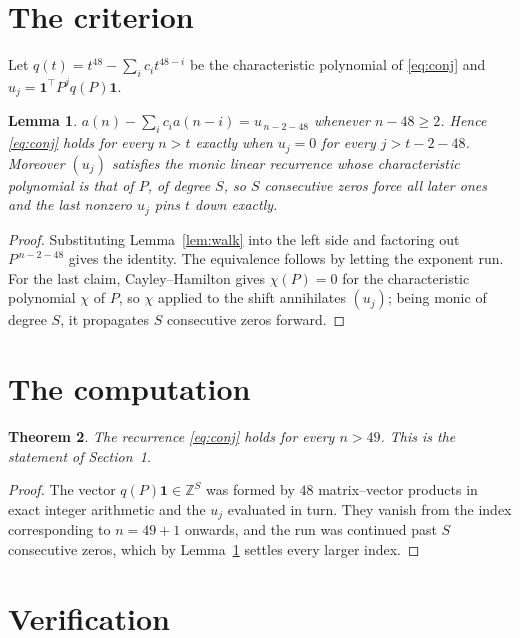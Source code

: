 \documentclass[11pt,a4paper]{article}
\theoremstyle{plain}
\newtheorem{theorem}{Theorem}
\newtheorem{lemma}[theorem]{Lemma}
\theoremstyle{definition}
\begin{document}
\section{The criterion}

Let $q(t)=t^{48}-\sum_i c_i t^{48-i}$ be the characteristic polynomial of
\eqref{eq:conj} and $u_j=\mathbf{1}^{\!\top}P^{j}q(P)\mathbf{1}$.

\begin{lemma}\label{lem:crit}
$a(n)-\sum_i c_i a(n-i)=u_{\,n-2-48}$ whenever $n-48\ge2$. Hence
\eqref{eq:conj} holds for every $n>t$ exactly when $u_j=0$ for every
$j>t-2-48$. Moreover $(u_j)$ satisfies the monic linear recurrence whose
characteristic polynomial is that of $P$, of degree $S$, so $S$ consecutive zeros force all
later ones and the last nonzero $u_j$ pins $t$ down exactly.
\end{lemma}

\begin{proof}
Substituting Lemma~\ref{lem:walk} into the left side and factoring out
$P^{\,n-2-48}$ gives the identity. The equivalence follows by letting the exponent
run. For the last claim, Cayley--Hamilton gives $\chi(P)=0$ for the characteristic
polynomial $\chi$ of $P$, so $\chi$ applied to the shift annihilates $(u_j)$; being monic of
degree $S$, it propagates $S$ consecutive zeros forward.
\end{proof}

\section{The computation}

\begin{theorem}
The recurrence \eqref{eq:conj} holds for every $n>49$. This is the statement of
Section~1.
\end{theorem}

\begin{proof}
The vector $q(P)\mathbf{1}\in\mathbb{Z}^{S}$ was formed by $48$ matrix--vector
products in exact integer arithmetic and the $u_j$ evaluated in turn. They vanish from the
index corresponding to $n=49+1$ onwards, and the run was continued past $S$ consecutive
zeros, which by Lemma~\ref{lem:crit} settles every larger index.
\end{proof}

\section{Verification}
\end{document}
